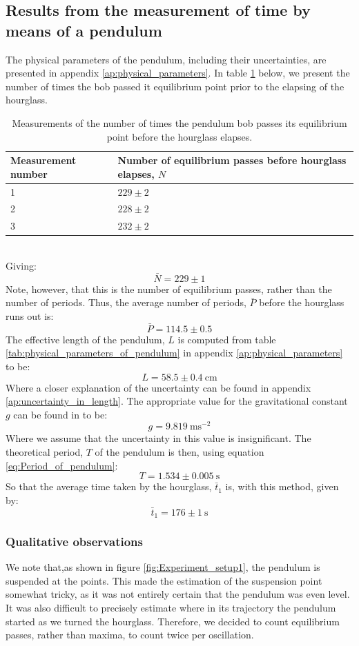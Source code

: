 \documentclass[a4paper, 10pt]{article}
\begin{document}
\subsection{Results from the measurement of time by means of a pendulum}\label{results_pendulum_length}
The physical parameters of the pendulum, including their uncertainties, are presented in appendix \ref{ap:physical_parameters}. In table \ref{tab:time_measurement_pendulum} below, we present the number of times the bob passed it equilibrium point prior to the elapsing of the hourglass.\\
\linebreak
\begin{table}[ht!]
\centering
\caption{Measurements of the number of times the pendulum bob passes its equilibrium point before the hourglass elapses.}
\label{tab:time_measurement_pendulum}
\begin{tabular}{|l|l|}
\hline
\textbf{Measurement number}                              & \textbf{Number of equilibrium passes before hourglass elapses, $N$}             \\
\hline
1                                  & $229\pm 2$  \\
2		                            & $228 \pm 2$    \\
3									 & $232 \pm 2$   \\

\hline 
\end{tabular}
\end{table}\\
Giving:
$$\bar{N}=229\pm 1$$
Note, however, that this is the number of equilibrium passes, rather than the number of periods. Thus, the average number of periods, $\bar{P}$ before the hourglass runs out is:
$$\bar{P}=114.5 \pm 0.5$$
The effective length of the pendulum, $L$ is computed from table \ref{tab:physical_parameters_of_pendulum} in appendix \ref{ap:physical_parameters} to be:
$$L=58.5 \pm 0.4 \ \mathrm{cm}$$
Where a closer explanation of the uncertainty can be found in appendix \ref{ap:uncertainty_in_length}. The appropriate value for the gravitational constant $g$ can be found in \cite{gravity} to be:
$$g = 9.819\ \mathrm{m s^{-2}}$$
Where we assume that the uncertainty in this value is insignificant. 
The theoretical period, $T$ of the pendulum is then, using equation \ref{eq:Period_of_pendulum}:
$$T=1.534 \pm 0.005 \ \mathrm{s}$$
So that the average time taken by the hourglass, $\bar{t}_1$ is, with this method, given by:
$$\bar{t}_1=176 \pm 1\ \mathrm{s}$$
\subsubsection{Qualitative observations}
We note that,as shown in figure \ref{fig:Experiment_setup1}, the pendulum is suspended at the points. This made the estimation of the suspension point somewhat tricky, as it was not entirely certain that the pendulum was even level. It was also difficult to precisely estimate where in its trajectory the pendulum started as we turned the hourglass. Therefore, we decided to count equilibrium passes, rather than maxima, to count twice per oscillation. 
\end{document}
